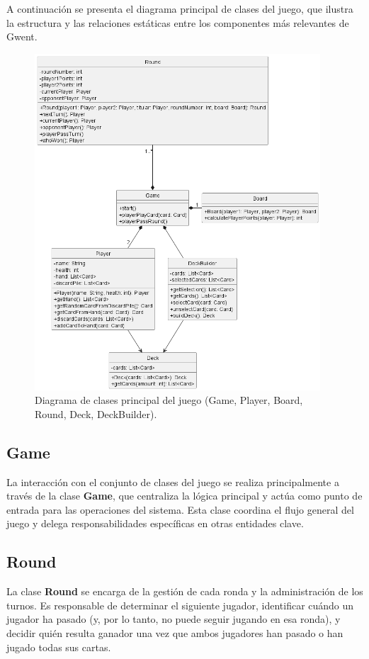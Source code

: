 \documentclass[titlepage,a4paper]{article}
\begin{document}
A continuación se presenta el diagrama principal de clases del juego, que ilustra la estructura y las relaciones estáticas entre los componentes más relevantes de Gwent.

\begin{figure}[H]
    \centering
    \includegraphics[width=0.95\textwidth]{../../../diagrams/classes/game.png}
    \caption{Diagrama de clases principal del juego (Game, Player, Board, Round, Deck, DeckBuilder).}
\end{figure}

\subsection*{Game}
La interacción con el conjunto de clases del juego se realiza principalmente a través de la clase \textbf{Game}, que centraliza la lógica principal y actúa como punto de entrada para las operaciones del sistema. Esta clase coordina el flujo general del juego y delega responsabilidades específicas en otras entidades clave.

\subsection*{Round}
La clase \textbf{Round} se encarga de la gestión de cada ronda y la administración de los turnos. Es responsable de determinar el siguiente jugador, identificar cuándo un jugador ha pasado (y, por lo tanto, no puede seguir jugando en esa ronda), y decidir quién resulta ganador una vez que ambos jugadores han pasado o han jugado todas sus cartas.
\end{document}
